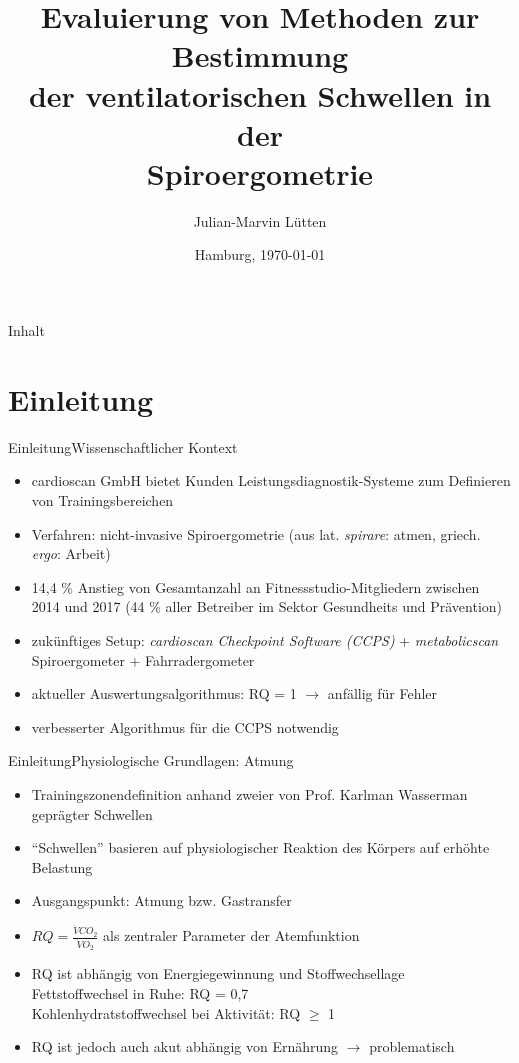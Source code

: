\documentclass[
handout, 
aspectratio=141, 
10pt,
xcolor=dvipsnames]
{beamer}
\title[Spiroergometrie \& Ventilatorische Schwellen]{Evaluierung von Methoden zur Bestimmung\\
der ventilatorischen Schwellen in der\\
Spiroergometrie}
\date{Hamburg, \today}
\author{Julian-Marvin Lütten}
\institute{Fachhochschule Lübeck}
\begin{document}
\begin{frame}[plain]
\maketitle
\end{frame}	

\begin{frame}{Inhalt}
\tableofcontents
\end{frame}

\section{Einleitung}

\begin{frame}{Einleitung}{Wissenschaftlicher Kontext}
\begin{itemize}
	\item cardioscan GmbH bietet Kunden Leistungsdiagnostik-Systeme zum Definieren von Trainingsbereichen 
	\item Verfahren: nicht-invasive Spiroergometrie (aus lat. \textsl{spirare}: atmen, griech. \textsl{ergo}: Arbeit)
	\item 14,4 \% Anstieg von Gesamtanzahl an Fitnessstudio-Mitgliedern zwischen 2014 und 2017 (44 \% aller Betreiber im Sektor Gesundheits und Prävention)
	\item zukünftiges Setup: \textsl{cardioscan Checkpoint Software (CCPS)} + \textsl{metabolicscan} Spiroergometer + Fahrradergometer
	\item aktueller Auswertungsalgorithmus: RQ = 1 $\rightarrow$ anfällig für Fehler
	\item verbesserter Algorithmus für die CCPS notwendig
\end{itemize}
\end{frame}

\begin{frame}{Einleitung}{Physiologische Grundlagen: Atmung}
\begin{itemize}
	\item Trainingszonendefinition anhand zweier von Prof. Karlman Wasserman geprägter Schwellen
	\item "`Schwellen"' basieren auf physiologischer Reaktion des Körpers auf erhöhte Belastung
	\item Ausgangspunkt: Atmung bzw. Gastransfer
	\item $RQ = \frac{\dot{V}CO_2}{\dot{V}O_2}$ als zentraler Parameter der Atemfunktion
	\item RQ ist abhängig von Energiegewinnung und Stoffwechsellage\\Fettstoffwechsel in Ruhe: RQ = 0,7\\Kohlenhydratstoffwechsel bei Aktivität: RQ $\geq$ 1
	\item RQ ist jedoch auch akut abhängig von Ernährung $\rightarrow$ problematisch
\end{itemize}
\end{frame}
\end{document}
